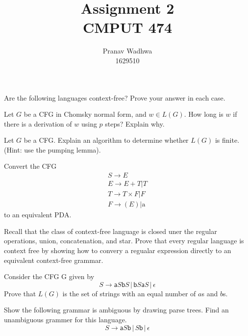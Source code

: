 \documentclass[12pt]{exam}
\title{
  Assignment 2\\
  \large CMPUT 474
}
\author{Pranav Wadhwa\\1629510}
\begin{document}
\maketitle
\noindent

\begin{questions}

  \question{} Are the following languages context-free? Prove your answer in each case.

  \question{} Let $G$ be a CFG in Chomsky normal form, and $w\in L(G)$. How long is $w$ if there is a derivation of $w$ using $p$ steps? Explain why.

  \question{} Let $G$ be a CFG. Explain an algorithm to determine whether $L(G)$ is finite. (Hint: use the pumping lemma).

  \question{} Convert the CFG
  \begin{gather*}
  S\to E\\
    E\to E+T|T\\
    T\to T \times F|F\\
    F\to (E)|\text{a}
    \end{gather*}
  to an equivalent PDA.


  \question{} Recall that the class of context-free language is closed uner the regular operations, union, concatenation, and star. Prove that every regular language is context free by showing how to convery a regualar expression directly to an equivalent context-free grammar.


  \question{} Consider the CFG G given by
  \[S\to \mathsf{a}S\mathsf{b}S\,|\,\mathsf{b}S\mathsf{a}S\,|\,\epsilon\]
  Prove that $L(G)$ is the set of strings with an equal number of $a$s and $b$s.


  \question{}
  Show the following grammar is ambiguous by drawing parse trees. Find an unambiguous grammer for this language.
  \[S\to \mathsf{a}S\mathsf{b}\,|\, S\mathsf{b}\,|\,\epsilon\]


\end{questions}
\end{document}
